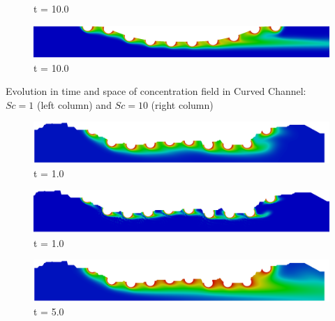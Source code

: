 \begin{frame}
\begin{figure}
\begin{minipage}{.50\linewidth}
      \tiny t = 10.0
     \end{minipage}%
     \begin{minipage}{.50\linewidth}
      \centering
      \includegraphics[scale=0.075]{images/conc10_CurvedStrut50000.png}\\
      \tiny t = 10.0
     \end{minipage}
\end{figure}
\vspace{-0.2cm}
\centering \scriptsize Evolution in time and space of concentration field in Curved Channel:\\
                 $Sc=1$ (left column) and $Sc=10$ (right column)
\vspace{0cm}
\begin{figure}
     \begin{minipage}{.50\linewidth}
      \centering
      \includegraphics[scale=0.075]{images/conc1_RealStrut2000.png}\\
      \tiny t = 1.0
     \end{minipage}%
     \begin{minipage}{.50\linewidth}
      \centering
      \includegraphics[scale=0.075]{images/conc10_RealStrut5000.png}\\
      \tiny t = 1.0
     \end{minipage}
     \begin{minipage}{.50\linewidth}
     \medskip
      \centering
      \includegraphics[scale=0.075]{images/conc1_RealStrut10000.png}\\
      \tiny t = 5.0
     \end{minipage}%
     \begin{minipage}{.50\linewidth}

\end{minipage}
\end{figure}
\end{frame}
